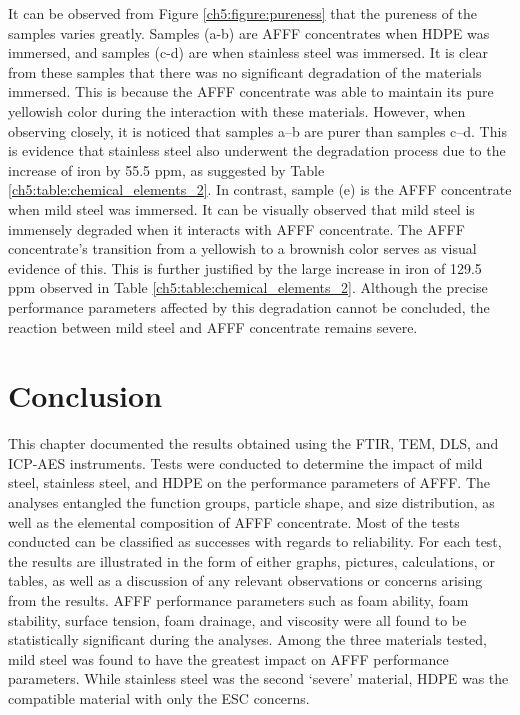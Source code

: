 It can be observed from Figure \ref{ch5:figure:pureness} that the pureness of the samples varies greatly. Samples (a-b) are AFFF concentrates when HDPE was immersed, and samples (c-d) are when stainless steel was immersed. It is clear from these samples that there was no significant degradation of the materials immersed. This is because the AFFF concentrate was able to maintain its pure yellowish color during the interaction with these materials. However, when observing closely, it is noticed that samples a–b are purer than samples c–d. This is evidence that stainless steel also underwent the degradation process due to the increase of iron by 55.5 ppm, as suggested by Table \ref{ch5:table:chemical_elements_2}. In contrast, sample (e) is the AFFF concentrate when mild steel was immersed. It can be visually observed that mild steel is immensely degraded when it interacts with AFFF concentrate. The AFFF concentrate's transition from a yellowish to a brownish color serves as visual evidence of this. This is further justified by the large increase in iron of 129.5 ppm observed in Table \ref{ch5:table:chemical_elements_2}. Although the precise performance parameters affected by this degradation cannot be concluded, the reaction between mild steel and AFFF concentrate remains severe.

\section{Conclusion}
This chapter documented the results obtained using the FTIR, TEM, DLS, and ICP-AES instruments. Tests were conducted to determine the impact of mild steel, stainless steel, and HDPE on the performance parameters of AFFF. The analyses entangled the function groups, particle shape, and size distribution, as well as the elemental composition of AFFF concentrate. Most of the tests conducted can be classified as successes with regards to reliability. For each test, the results are illustrated in the form of either graphs, pictures, calculations, or tables, as well as a discussion of any relevant observations or concerns arising from the results. AFFF performance parameters such as foam ability, foam stability, surface tension, foam drainage, and viscosity were all found to be statistically significant during the analyses. Among the three materials tested, mild steel was found to have the greatest impact on AFFF performance parameters. While stainless steel was the second ‘severe’ material, HDPE was the compatible material with only the ESC concerns.